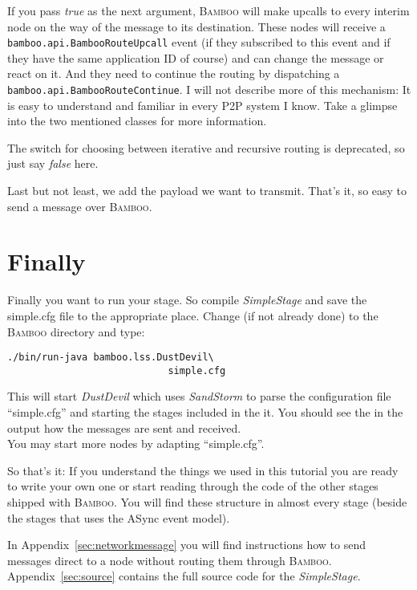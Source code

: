 \documentclass[twocolumn, twoside, a4paper]{article}
\begin{document}
If you pass \emph{true} as the next argument, \textsc{Bamboo} will make upcalls
to every interim node on the way of the message to its
destination. These nodes will receive a
\texttt{bamboo.api.BambooRouteUpcall} event (if they subscribed to
this event and if they have the same application ID of course) and can
change the message or react on it. And they need to continue the
routing by dispatching a \texttt{bamboo.api.BambooRouteContinue}. I
will not describe more of this mechanism: It is easy to understand and
familiar in every P2P system I know. Take a glimpse into the two
mentioned classes for more information.

The switch for choosing between iterative and recursive routing is
deprecated, so just say \emph{false} here.

Last but not least, we add the payload we want to transmit. That's it,
so easy to send a message over \textsc{Bamboo}.


\section{Finally}
\label{sec:final}

Finally you want to run your stage. So compile \emph{SimpleStage} and
save the simple.cfg file to the appropriate place. Change (if not
already done) to the \textsc{Bamboo} directory and type:

\lstset{language=Perl, basicstyle=\small, numbers=none, aboveskip=10pt, belowskip=10pt}
\begin{lstlisting}
./bin/run-java bamboo.lss.DustDevil\ 
                            simple.cfg
\end{lstlisting}

This will start \emph{DustDevil} which uses \emph{SandStorm} to parse the
configuration file ``simple.cfg'' and starting the stages included in
the it. You should see the in the output how the messages are sent and
received.\\
You may start more nodes by adapting ``simple.cfg''.

So that's it: If you understand the things we used in this tutorial
you are ready to write your own one or start reading through the code
of the other stages shipped with \textsc{Bamboo}. You will find these structure
in almost every stage (beside the stages that uses the ASync event
model).

In Appendix~\ref{sec:networkmessage} you will find instructions how to
send messages direct to a node without routing them through
\textsc{Bamboo}. Appendix~\ref{sec:source} contains the full source code for
the \emph{SimpleStage}.
\end{document}
